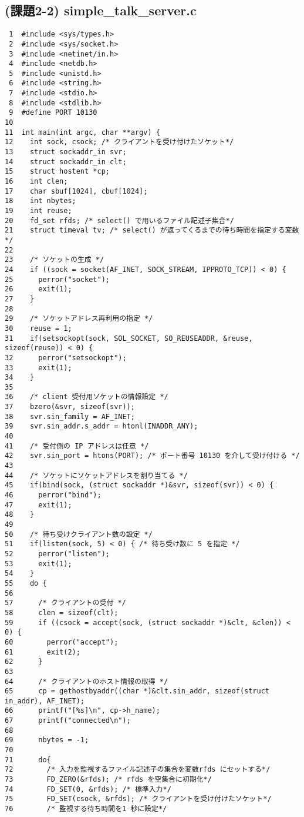 \documentclass[a4j]{jarticle}
\begin{document}
\subsection{(課題2-2) simple\_talk\_server.c}
\label{sec:simple-talk-server_code}
\small{
\begin{verbatim}
 1  #include <sys/types.h>
 2  #include <sys/socket.h>
 3  #include <netinet/in.h>
 4  #include <netdb.h>
 5  #include <unistd.h>
 6  #include <string.h>
 7  #include <stdio.h>
 8  #include <stdlib.h>
 9  #define PORT 10130
10
11  int main(int argc, char **argv) {
12    int sock, csock; /* クライアントを受け付けたソケット*/
13    struct sockaddr_in svr;
14    struct sockaddr_in clt;
15    struct hostent *cp;
16    int clen;
17    char sbuf[1024], cbuf[1024];
18    int nbytes;
19    int reuse;
20    fd_set rfds; /* select() で用いるファイル記述子集合*/
21    struct timeval tv; /* select() が返ってくるまでの待ち時間を指定する変数*/
22
23    /* ソケットの生成 */
24    if ((sock = socket(AF_INET, SOCK_STREAM, IPPROTO_TCP)) < 0) {
25      perror("socket");
26      exit(1);
27    }
28
29    /* ソケットアドレス再利用の指定 */
30    reuse = 1;
31    if(setsockopt(sock, SOL_SOCKET, SO_REUSEADDR, &reuse, sizeof(reuse)) < 0) {
32      perror("setsockopt");
33      exit(1);
34    }
35
36    /* client 受付用ソケットの情報設定 */
37    bzero(&svr, sizeof(svr));
38    svr.sin_family = AF_INET;
39    svr.sin_addr.s_addr = htonl(INADDR_ANY);
40
41    /* 受付側の IP アドレスは任意 */
42    svr.sin_port = htons(PORT); /* ポート番号 10130 を介して受け付ける */
43
44    /* ソケットにソケットアドレスを割り当てる */
45    if(bind(sock, (struct sockaddr *)&svr, sizeof(svr)) < 0) {
46      perror("bind");
47      exit(1);
48    }
49
50    /* 待ち受けクライアント数の設定 */
51    if(listen(sock, 5) < 0) { /* 待ち受け数に 5 を指定 */
52      perror("listen");
53      exit(1);
54    }
55    do {
56
57      /* クライアントの受付 */
58      clen = sizeof(clt);
59      if ((csock = accept(sock, (struct sockaddr *)&clt, &clen)) < 0) {
60        perror("accept");
61        exit(2);
62      }
63
64      /* クライアントのホスト情報の取得 */
65      cp = gethostbyaddr((char *)&clt.sin_addr, sizeof(struct in_addr), AF_INET);
66      printf("[%s]\n", cp->h_name);
67      printf("connected\n");
68
69      nbytes = -1;
70
71      do{
72        /* 入力を監視するファイル記述子の集合を変数rfds にセットする*/
73        FD_ZERO(&rfds); /* rfds を空集合に初期化*/
74        FD_SET(0, &rfds); /* 標準入力*/
75        FD_SET(csock, &rfds); /* クライアントを受け付けたソケット*/
76        /* 監視する待ち時間を1 秒に設定*/

\end{verbatim}}
\end{document}
